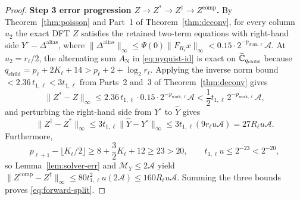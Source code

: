 \begin{proof}
\textbf{Step 3 error progression $Z \to Z^* \to Z^\dagger \to Z^{\mathrm{comp}}$.}
By Theorem~\ref{thm:poisson} and Part~1 of Theorem~\ref{thm:deconv}, for every column $u_2$ the exact DFT $Z$ satisfies the retained two-term equations with right-hand side $Y^\circ - \Delta^{\mathrm{alias}}$, where $\|\Delta^{\mathrm{alias}}\|_\infty \le \Psi(0)\|F_{R_\ell} x\|_\infty < 0.15 \cdot 2^{-p_{\mathrm{work},\ell}}\mathcal{A}$. At $u_2 = r_\ell/2$, the alternating sum $A_{\mathrm{N}}$ in \eqref{eq:nyquist-id} is exact on $\widetilde{\mathbb{C}}_{q_{\mathrm{child}}}$ because $q_{\mathrm{child}} = p_\ell + 2 K_\ell + 14 > p_\ell + 2 + \log_2 r_\ell$. Applying the inverse norm bound $< 2.36 \, t_{1,\ell} < 3 t_{1,\ell}$ from Parts~2 and~3 of Theorem~\ref{thm:deconv} gives
\[
  \|Z^* - Z\|_\infty \le 2.36 \, t_{1,\ell} \cdot 0.15 \cdot 2^{-p_{\mathrm{work},\ell}} \mathcal{A} < \frac{1}{2} t_{1,\ell} \, 2^{-p_{\mathrm{work},\ell}} \mathcal{A},
\]
and perturbing the right-hand side from $Y^\circ$ to $\widehat{Y}$ gives
\[
  \|Z^\dagger - Z^*\|_\infty \le 3 t_{1,\ell} \|\widehat{Y} - Y^\circ\|_\infty \le 3 t_{1,\ell} (9 r_\ell u \mathcal{A}) = 27 R_\ell u \mathcal{A}.
\]
Furthermore,
\[
  p_{\ell+1} - \lfloor K_\ell / 2 \rfloor \ge 8 + \frac{3}{2} K_\ell + 12 \ge 23 > 20, \qquad t_{1,\ell} u \le 2^{-23} < 2^{-20},
\]
so Lemma~\ref{lem:solver-err} and $\mathcal{M}_Y \le 2\mathcal{A}$ yield $\|Z^{\mathrm{comp}} - Z^\dagger\|_\infty \le 80 t_{1,\ell}^2 u (2\mathcal{A}) \le 160 R_\ell u \mathcal{A}$. Summing the three bounds proves \eqref{eq:forward-split}.


\end{proof}
